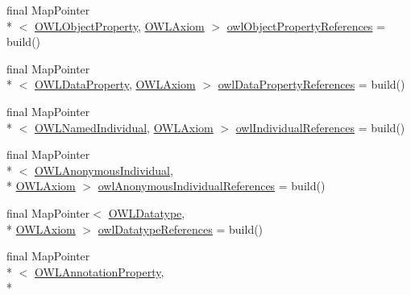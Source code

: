 \begin{DoxyCompactItemize}
final Map\-Pointer\\*
$<$ \hyperlink{interfaceorg_1_1semanticweb_1_1owlapi_1_1model_1_1_o_w_l_object_property}{O\-W\-L\-Object\-Property}, \hyperlink{interfaceorg_1_1semanticweb_1_1owlapi_1_1model_1_1_o_w_l_axiom}{O\-W\-L\-Axiom} $>$ \hyperlink{classuk_1_1ac_1_1manchester_1_1cs_1_1owl_1_1owlapi_1_1_internals_impl_a34b2d060e7b78461284f1e39e6b79704}{owl\-Object\-Property\-References} = build()
\item 
final Map\-Pointer\\*
$<$ \hyperlink{interfaceorg_1_1semanticweb_1_1owlapi_1_1model_1_1_o_w_l_data_property}{O\-W\-L\-Data\-Property}, \hyperlink{interfaceorg_1_1semanticweb_1_1owlapi_1_1model_1_1_o_w_l_axiom}{O\-W\-L\-Axiom} $>$ \hyperlink{classuk_1_1ac_1_1manchester_1_1cs_1_1owl_1_1owlapi_1_1_internals_impl_a92e19ac76b55956986a2ca35ee89eabb}{owl\-Data\-Property\-References} = build()
\item 
final Map\-Pointer\\*
$<$ \hyperlink{interfaceorg_1_1semanticweb_1_1owlapi_1_1model_1_1_o_w_l_named_individual}{O\-W\-L\-Named\-Individual}, \hyperlink{interfaceorg_1_1semanticweb_1_1owlapi_1_1model_1_1_o_w_l_axiom}{O\-W\-L\-Axiom} $>$ \hyperlink{classuk_1_1ac_1_1manchester_1_1cs_1_1owl_1_1owlapi_1_1_internals_impl_a4e750f46047c6eb4ddac291af9d109b1}{owl\-Individual\-References} = build()
\item 
final Map\-Pointer\\*
$<$ \hyperlink{interfaceorg_1_1semanticweb_1_1owlapi_1_1model_1_1_o_w_l_anonymous_individual}{O\-W\-L\-Anonymous\-Individual}, \\*
\hyperlink{interfaceorg_1_1semanticweb_1_1owlapi_1_1model_1_1_o_w_l_axiom}{O\-W\-L\-Axiom} $>$ \hyperlink{classuk_1_1ac_1_1manchester_1_1cs_1_1owl_1_1owlapi_1_1_internals_impl_ad9a6200a1d3b8af42756f06336243c6b}{owl\-Anonymous\-Individual\-References} = build()
\item 
final Map\-Pointer$<$ \hyperlink{interfaceorg_1_1semanticweb_1_1owlapi_1_1model_1_1_o_w_l_datatype}{O\-W\-L\-Datatype}, \\*
\hyperlink{interfaceorg_1_1semanticweb_1_1owlapi_1_1model_1_1_o_w_l_axiom}{O\-W\-L\-Axiom} $>$ \hyperlink{classuk_1_1ac_1_1manchester_1_1cs_1_1owl_1_1owlapi_1_1_internals_impl_a16f75890a2db900501497dfdbac2a260}{owl\-Datatype\-References} = build()
\item 
final Map\-Pointer\\*
$<$ \hyperlink{interfaceorg_1_1semanticweb_1_1owlapi_1_1model_1_1_o_w_l_annotation_property}{O\-W\-L\-Annotation\-Property}, \\*

\end{DoxyCompactItemize}
